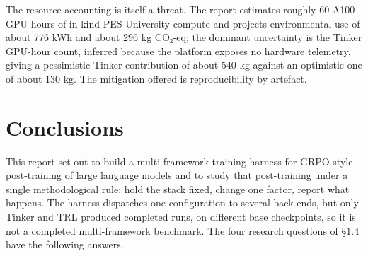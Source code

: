 \documentclass[12pt,a4paper]{report}
\begin{document}
The resource accounting is itself a threat. The report estimates roughly
60 A100 GPU-hours of in-kind PES University compute and projects
environmental use of about 776 kWh and about 296 kg CO₂-eq; the dominant
uncertainty is the Tinker GPU-hour count, inferred because the platform
exposes no hardware telemetry, giving a pessimistic Tinker contribution
of about 540 kg against an optimistic one of about 130 kg. The
mitigation offered is reproducibility by artefact.

\section{Conclusions}\label{conclusions}

This report set out to build a multi-framework training harness for
GRPO-style post-training of large language models and to study that
post-training under a single methodological rule: hold the stack fixed,
change one factor, report what happens. The harness dispatches one
configuration to several back-ends, but only Tinker and TRL produced
completed runs, on different base checkpoints, so it is not a completed
multi-framework benchmark. The four research questions of §1.4 have the
following answers.
\end{document}
